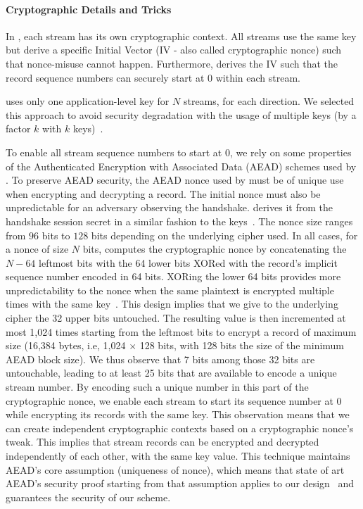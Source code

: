 \paragraph*{Cryptographic Details and Tricks} In \tcpls, each stream has its own
cryptographic context. All streams use the same key but derive a specific
Initial Vector (IV - also called cryptographic nonce) such that nonce-misuse
cannot happen. Furthermore, \tcpls derives the IV such that the record sequence
numbers can securely start at $0$ within each stream.

\tcpls uses only one application-level key for $N$ streams, for each direction.
We selected this approach to avoid security degradation with the usage of
multiple keys (by a factor $k$ with $k$ keys)~\cite{chatterjee2011another}.

To enable all stream sequence numbers to start at 0, we rely on some properties
of the Authenticated Encryption with Associated Data (AEAD) schemes used by . To preserve AEAD security, the AEAD nonce used by \tcpls must be of unique
use when encrypting and decrypting a record. The initial nonce must also be
unpredictable for an adversary observing the handshake. \tcpls derives it from
the \tls handshake session secret in a similar fashion to the \tls
keys~\cite{rfc8446}. The nonce size ranges from $96$ bits to $128$ bits
depending on the underlying cipher used. In all cases, for a nonce of size $N$
bits, \tls computes the cryptographic nonce by concatenating the $N-64$ leftmost
bits with the 64 lower bits XORed with the record's implicit sequence number
encoded in 64 bits. XORing the lower 64 bits provides more unpredictability to
the nonce when the same plaintext is encrypted multiple times with the same
key~\cite{bellare2016multi,hoang2018multi}. This design implies that we give to
the underlying cipher the 32 upper bits untouched. The resulting value is then
incremented at most 1,024 times starting from the leftmost bits to encrypt a
\tls record of maximum size (16,384 bytes,
i.e, 1,024 $\times$ 128 bits, with 128 bits the size of the minimum AEAD block
size). We thus observe that 7 bits among those 32 bits are untouchable, leading
to at least 25 bits that are available to encode a unique stream number. By
encoding such a unique number in this part of the cryptographic nonce, we enable
each stream to start its sequence number at 0 while encrypting its records with
the same key. This observation means that we can create independent
cryptographic contexts based on a cryptographic nonce's tweak. This implies
that stream records can be encrypted and decrypted independently of each other,
with the same key value. This technique maintains AEAD's core assumption
(uniqueness of nonce), which means that state of art AEAD's security proof
starting from that assumption applies to our
design~\cite{chatterjee2011another} and guarantees the security of our scheme.

